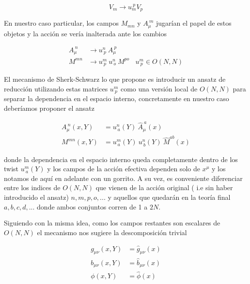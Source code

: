 \documentclass{article}
\numberwithin{equation}{section}
\begin{document}
\begin{equation}
V_{m} \longrightarrow u_{m}^{\ p}  V_{p}
\end{equation}

En nuestro caso particular, los campos $ M_{m n} $ y $ A_{\mu}^{\ m} $ jugarían el papel de estos objetos y la acción se vería inalterada ante los cambios

\begin{equation}
\begin{aligned}
A_{\mu}^{\ n}& \longrightarrow u^{n}_{\ p} \ A_{\mu}^{\ p}\\
M^{m n}& \longrightarrow u^{m}_{\ p} \ u^{n}_{\ o} \ M^{p o} \ \ \ \ u^{m}_{\ p} \in O(N,N)
\end{aligned}
\end{equation}


El mecanismo de Sherk-Schwarz lo que propone es introducir un ansatz de reducción utilizando estas matrices $ u^{m}_{\ p} $ como una versión local de $ O(N,N) $ para separar la dependencia en el espacio interno, concretamente en nuestro caso deberíamos proponer el ansatz


\begin{subequations}
	\begin{align}
	A_{\mu}^{\ n}(x,Y)&= u^{n}_{\ a}(Y) \ \hat{A}_{\mu}^{\ a}(x)\\
	M^{m n}(x,Y)&= u^{m}_{\ a}(Y) \ u^{n}_{\ b}(Y) \ \hat{M}^{a b}(x)
	\end{align}
\end{subequations}


donde la dependencia en el espacio interno queda completamente dentro de los twist $ u^{m}_{\ a}(Y) $ y los campos de la acción efectiva dependen solo de $ x^{\mu} $ y los notamos de aquí en adelante con un gorrito. A su vez, es conveniente diferenciar entre los indices de $ O(N,N) $ que vienen de la acción original ( i.e sin haber introducido el ansatz) $ n,m,p,o,...  $ y aquellos que quedarán en la teoría final $ a,b,c,d,... $ donde ambos conjuntos corren de 1 a $ 2N $.

Siguiendo con la misma idea, como los campos restantes son escalares de $ O(N,N) $ el mecanismo nos sugiere la descomposición trivial

\begin{equation}
\begin{aligned}
g_{\mu \nu}(x,Y)&= \hat{g}_{\mu \nu}(x)\\
b_{\mu \nu}(x,Y)&= \hat{b}_{\mu \nu}(x)\\
\phi(x,Y)&= \hat{\phi}(x)\\
\end{aligned}
\end{equation}
\end{document}
